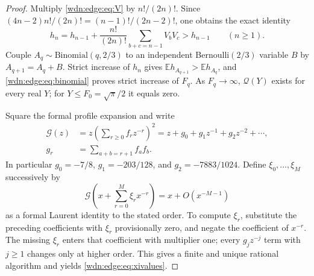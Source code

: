 \documentclass[11pt,letterpaper]{article}
\theoremstyle{remark}\newtheorem{remark}[theorem]{Remark}
\newcommand{\E}{\mathbb E}
\begin{document}
\begin{proof}
Multiply \eqref{wdn:edge:eq:V} by $n!/(2n)!$. Since
$(4n-2)n!/(2n)!=(n-1)!/(2n-2)!$, one obtains the exact identity
\begin{equation}\label{wdn:edge:eq:hmonotone}
 h_n=h_{n-1}+\frac{n!}{(2n)!}\sum_{b+c=n-1}V_bV_c>h_{n-1}
 \qquad(n\ge1).
\end{equation}
Couple $A_q\sim\mathrm{Binomial}(q,2/3)$ to an independent
Bernoulli$(2/3)$ variable $B$ by $A_{q+1}=A_q+B$.
Strict increase of $h_n$ gives $\E h_{A_{q+1}}>\E h_{A_q}$,
and \eqref{wdn:edge:eq:binomial} proves strict increase of $F_q$.
As $F_q\to\infty$, $\mathcal Q(Y)$ exists for every real $Y$;
for $Y\le F_0=\sqrt\pi/2$ it equals zero.

Square the formal profile expansion and write
\begin{equation}\label{wdn:edge:eq:Greversion}
 \begin{split}
 \mathcal G(z)&=z\left(\sum_{r\ge0}f_rz^{-r}\right)^2
      =z+g_0+g_1z^{-1}+g_2z^{-2}+\cdots,\\
 g_r&=\sum_{a+b=r+1}f_af_b.
 \end{split}
\end{equation}
In particular $g_0=-7/8$, $g_1=-203/128$, and $g_2=-7883/1024$.
Define $\xi_0,\ldots,\xi_M$ successively by
\begin{equation}\label{wdn:edge:eq:reversion}
 \mathcal G\left(x+\sum_{r=0}^M\xi_r x^{-r}\right)
      =x+O(x^{-M-1})
\end{equation}
as a formal Laurent identity to the stated order. To compute $\xi_r$,
substitute the preceding coefficients with $\xi_r$ provisionally zero,
and negate the coefficient of $x^{-r}$. The missing $\xi_r$ enters that
coefficient with multiplier one; every $g_jz^{-j}$ term with $j\ge1$
changes only at higher order. This gives a finite and unique rational
algorithm and yields \eqref{wdn:edge:eq:xivalues}.


\end{proof}
\end{document}
